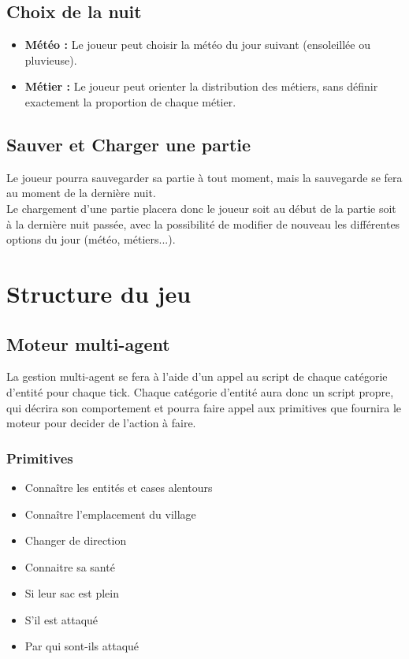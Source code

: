 \documentclass[a4paper]{article}
\newcommand{\alinea}{\hspace*{0.5cm}}
\begin{document}
        \subsection{Choix de la nuit}
          \begin{itemize} \small
            \item \textbf{Météo :} Le joueur peut choisir la météo du jour suivant (ensoleillée ou pluvieuse).
            \item \textbf{Métier :} Le joueur peut orienter la distribution des métiers, sans définir exactement la proportion de chaque métier.
          \end{itemize} \normalsize
		  
        \subsection{Sauver et Charger une partie}
          \alinea Le joueur pourra sauvegarder sa partie à tout moment, mais la sauvegarde se fera au moment de la dernière nuit.\\
          Le chargement d'une partie placera donc le joueur soit au début de la partie soit à la dernière nuit passée, avec la possibilité de modifier de nouveau les différentes options du jour (météo, métiers...).
    
    \section{Structure du jeu}
    
      \subsection{Moteur multi-agent}
        \alinea La gestion multi-agent se fera à l'aide d'un appel au script de chaque catégorie d'entité pour chaque tick. Chaque catégorie d'entité aura donc un script propre, qui décrira son comportement et pourra faire appel aux primitives que fournira le moteur pour decider de l'action à faire.

        \subsubsection{Primitives}
          \begin{itemize} \small
            \item Connaître les entités et cases alentours
            \item Connaître l'emplacement du village
            \item Changer de direction
            \item Connaitre sa santé
            \item Si leur sac est plein
            \item S'il est attaqué
            \item Par qui sont-ils attaqué
          \end{itemize} \normalsize
		  
\end{document}
